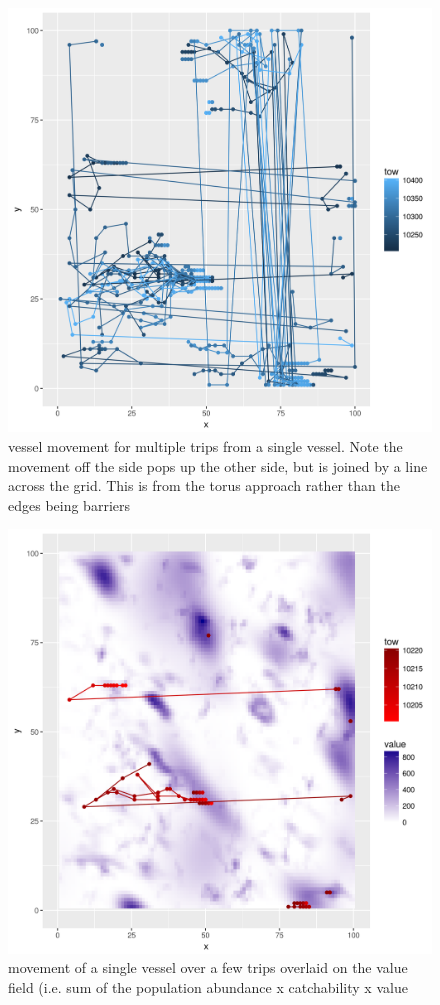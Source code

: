 \documentclass[review]{elsarticle}
\begin{document}
\begin{figure}[!ht]
	\includegraphics[width = \linewidth]{../tests/plots/vessel_multi_move}
	\caption{vessel movement for multiple trips from a single vessel. Note
	the movement off the side pops up the other side, but is joined by a
	line across the grid. This is from the torus approach rather than the
	edges being barriers}
	\label{fig:5}
\end{figure}	

\begin{figure}[!ht]
	\includegraphics[width = \linewidth]{../tests/plots/vessel_move_value}
	\caption{movement of a single vessel over a few trips overlaid on the
		value field (i.e. sum of the population abundance x catchability x value}
	\label{fig:6}
\end{figure}	
\end{document}

